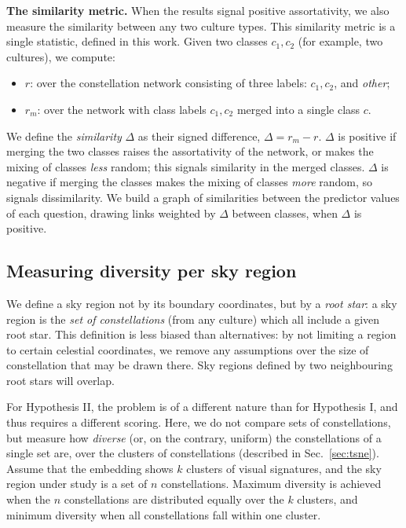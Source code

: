 \documentclass[10pt]{article}
\begin{document}
{\bf The similarity metric.} When the results signal positive assortativity, we also measure the similarity between any two culture types. This similarity metric is a single statistic, defined in this work. Given two classes $c_1, c_2$ (for example, two cultures), we compute:

\begin{itemize}
	\item $r$: over the constellation network consisting of three labels: $c_1, c_2$, and \emph{other};
	\item $r_m$: over the network with class labels $c_1, c_2$ merged into a single class $c$.
\end{itemize}

We define the \emph{similarity} $\Delta$ as their signed difference, $\Delta = r_m - r$. $\Delta$ is positive if merging the two classes raises the assortativity of the network, or makes the mixing of classes \emph{less} random; this signals similarity in the merged classes. $\Delta$ is negative if merging the classes makes the mixing of classes \emph{more} random, so signals dissimilarity. We build a graph of similarities between the predictor values of each question, drawing links weighted by $\Delta$ between classes, when $\Delta$ is positive.

\subsection{Measuring diversity per sky region}
\label{sec:diversity}

We define a sky region not by its boundary coordinates, but by a \emph{root star}: a sky region is the \emph{set of constellations} (from any culture) which all include a given root star. This definition is less biased than alternatives: by not limiting a region to certain celestial coordinates, we remove any assumptions over the size of constellation that may be drawn there. Sky regions defined by two neighbouring root stars will overlap.

For Hypothesis II, the problem is of a different nature than for Hypothesis I, and thus requires a different scoring. Here, we do not compare sets of constellations, but measure how \emph{diverse} (or, on the contrary, uniform) the constellations of a single set are, over the clusters of constellations (described in Sec.~\ref{sec:tsne}). Assume that the embedding shows $k$ clusters of visual signatures, and the sky region under study is a set of $n$ constellations. Maximum diversity is achieved when the $n$ constellations are distributed equally over the $k$ clusters, and minimum diversity when all constellations fall within one cluster. 
\end{document}

